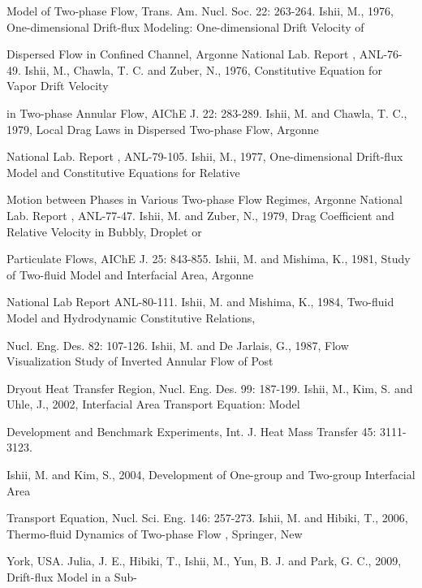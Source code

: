 \documentclass[11pt,a4paper,openany,fontset=none]{ctexbook}
\begin{document}
{\small\raggedright\noindent Model of Two-phase Flow, Trans. Am. Nucl. Soc. 22: 263-264. Ishii, M., 1976, One-dimensional Drift-flux Modeling: One-dimensional Drift Velocity of\par}
{\small\raggedright\noindent Dispersed Flow in Confined Channel, Argonne National Lab. Report , ANL-76-49. Ishii, M., Chawla, T. C. and Zuber, N., 1976, Constitutive Equation for Vapor Drift Velocity\par}
{\small\raggedright\noindent in Two-phase Annular Flow, AIChE J. 22: 283-289. Ishii, M. and Chawla, T. C., 1979, Local Drag Laws in Dispersed Two-phase Flow, Argonne\par}
{\small\raggedright\noindent National Lab. Report , ANL-79-105. Ishii, M., 1977, One-dimensional Drift-flux Model and Constitutive Equations for Relative\par}
{\small\raggedright\noindent Motion between Phases in Various Two-phase Flow Regimes, Argonne National Lab. Report , ANL-77-47. Ishii, M. and Zuber, N., 1979, Drag Coefficient and Relative Velocity in Bubbly, Droplet or\par}
{\small\raggedright\noindent Particulate Flows, AIChE J. 25: 843-855. Ishii, M. and Mishima, K., 1981, Study of Two-fluid Model and Interfacial Area, Argonne\par}
{\small\raggedright\noindent National Lab Report ANL-80-111. Ishii, M. and Mishima, K., 1984, Two-fluid Model and Hydrodynamic Constitutive Relations,\par}
{\small\raggedright\noindent Nucl. Eng. Des. 82: 107-126. Ishii, M. and De Jarlais, G., 1987, Flow Visualization Study of Inverted Annular Flow of Post\par}
{\small\raggedright\noindent Dryout Heat Transfer Region, Nucl. Eng. Des. 99: 187-199. Ishii, M., Kim, S. and Uhle, J., 2002, Interfacial Area Transport Equation: Model\par}
{\small\raggedright\noindent Development and Benchmark Experiments, Int. J. Heat Mass Transfer 45: 3111-3123.\par}
{\small\raggedright\noindent Ishii, M. and Kim, S., 2004, Development of One-group and Two-group Interfacial Area\par}
{\small\raggedright\noindent Transport Equation, Nucl. Sci. Eng. 146: 257-273. Ishii, M. and Hibiki, T., 2006, Thermo-fluid Dynamics of Two-phase Flow , Springer, New\par}
{\small\raggedright\noindent York, USA. Julia, J. E., Hibiki, T., Ishii, M., Yun, B. J. and Park, G. C., 2009, Drift-flux Model in a Sub-\par}
\end{document}
